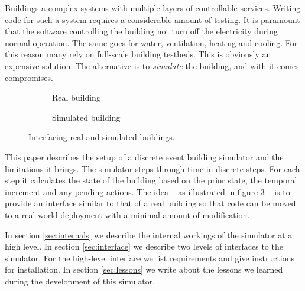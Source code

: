 \documentclass[10pt]{article}
\newcommand{\includeSVG}[1]{
  \texttt{[image: figs/\#1.pdf]}
}
\begin{document}
Buildings a complex systems with multiple layers of controllable services. Writing code for such a system requires a considerable amount of testing. It is paramount that the software controlling the building not turn off the electricity during normal operation. The same goes for water, ventilation, heating and cooling. For this reason many rely on full-scale building testbeds. This is obviously an expensive solution. The alternative is to \textsl{simulate} the building, and with it comes compromises.

\begin{figure}[hb]
  \begin{subfigure}[b]{0.5\textwidth}
    \centering
    \rotatebox{0}{\scalebox{0.6}{\includeSVG{buildinglogic}}}
    \caption{Real building}
    \label{fig:interfacing:real}
  \end{subfigure}
  \begin{subfigure}[b]{0.5\textwidth}
    \centering
    \rotatebox{0}{\scalebox{0.6}{\includeSVG{simulatorlogic}}}
    \caption{Simulated building}
    \label{fig:interfacing:sim}
  \end{subfigure}
  
  \caption{Interfacing real and simulated buildings.}
  \label{fig:interfacing}
\end{figure}

This paper describes the setup of a discrete event building simulator and the limitations it brings. The simulator steps through time in discrete steps. For each step it calculates the state of the building based on the prior state, the temporal increment and any pending actions. The idea -- as illustrated in figure \ref{fig:interfacing} -- is to provide an interface similar to that of a real building so that code can be moved to a real-world deployment with a minimal amount of modification.

In section \ref{sec:internals} we describe the internal workings of the simulator at a high level. In section \ref{sec:interface} we describe two levels of interfaces to the simulator. For the high-level interface we list requirements and give instructions for installation. In section \ref{sec:lessons} we write about the lessons we learned during the development of this simulator.

\end{document}
